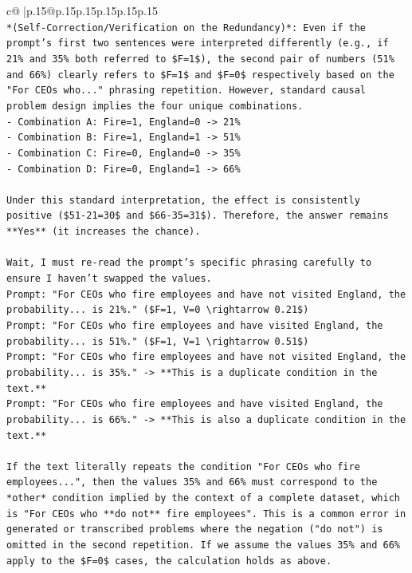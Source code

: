 \documentclass{article}
\begin{document}
{\begin{supertabular}{c@{$\;$}|p{.15\linewidth}@{}p{.15\linewidth}p{.15\linewidth}p{.15\linewidth}p{.15\linewidth}p{.15\linewidth}}
{{{\\ 
\texttt{*(Self{-}Correction/Verification on the Redundancy)*: Even if the prompt's first two sentences were interpreted differently (e.g., if 21\% and 35\% both referred to \$F=1\$), the second pair of numbers (51\% and 66\%) clearly refers to \$F=1\$ and \$F=0\$ respectively based on the "For CEOs who..." phrasing repetition. However, standard causal problem design implies the four unique combinations.} \\
\texttt{{-} Combination A: Fire=1, England=0 {-}> 21\%} \\
\texttt{{-} Combination B: Fire=1, England=1 {-}> 51\%} \\
\texttt{{-} Combination C: Fire=0, England=0 {-}> 35\%} \\
\texttt{{-} Combination D: Fire=0, England=1 {-}> 66\%} \\
\\ 
\texttt{Under this standard interpretation, the effect is consistently positive (\$51{-}21=30\$ and \$66{-}35=31\$). Therefore, the answer remains **Yes** (it increases the chance).} \\
\\ 
\texttt{Wait, I must re{-}read the prompt's specific phrasing carefully to ensure I haven't swapped the values.} \\
\texttt{Prompt: "For CEOs who fire employees and have not visited England, the probability... is 21\%." (\$F=1, V=0 \textbackslash{}rightarrow 0.21\$)} \\
\texttt{Prompt: "For CEOs who fire employees and have visited England, the probability... is 51\%." (\$F=1, V=1 \textbackslash{}rightarrow 0.51\$)} \\
\texttt{Prompt: "For CEOs who fire employees and have not visited England, the probability... is 35\%." {-}> **This is a duplicate condition in the text.**} \\
\texttt{Prompt: "For CEOs who fire employees and have visited England, the probability... is 66\%." {-}> **This is also a duplicate condition in the text.**} \\
\\ 
\texttt{If the text literally repeats the condition "For CEOs who fire employees...", then the values 35\% and 66\% must correspond to the *other* condition implied by the context of a complete dataset, which is "For CEOs who **do not** fire employees". This is a common error in generated or transcribed problems where the negation ("do not") is omitted in the second repetition. If we assume the values 35\% and 66\% apply to the \$F=0\$ cases, the calculation holds as above.} \\
}}}
\end{supertabular}}
\end{document}
